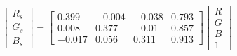 \begin{equation}
\begin{bmatrix}
  R_s \\ G_s \\ B_s 
\end{bmatrix}=
\left[\begin{matrix}0.399 & -0.004 & -0.038 & 0.793\\ 
0.008 & 0.377 & -0.01 & 0.857\\ 
-0.017 & 0.056 & 0.311 & 0.913\end{matrix}\right]
\begin{bmatrix}
  R \\ G \\ B \\ 1 
\end{bmatrix}
\end{equation}
